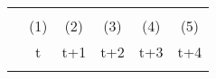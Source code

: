 

    \begin{tabular}{lccccc} \hline
    \vspace{-2pt} & \vspace{-2pt} & \vspace{-2pt} & \vspace{-2pt} & \vspace{-2pt} \\
     & (1) & (2) & (3) & (4) & (5) \\
     & t & t+1 & t+2 & t+3 & t+4 \\ 
    \vspace{-2pt} & \vspace{-2pt} & \vspace{-2pt} & \vspace{-2pt} & \vspace{-2pt} \\\hline


\end{tabular}
